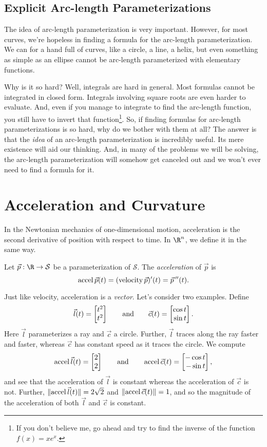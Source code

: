 \subsection{Explicit Arc-length Parameterizations}
The idea of arc-length parameterization is very important.  However, for most curves,
we're hopeless in finding a formula for the arc-length parameterization.  We can for a hand
full of curves, like a circle, a line, a helix, but even something as simple as an ellipse
cannot be arc-length parameterized with elementary functions.

Why is it so hard?  Well, integrals are hard in general.  Most formulas cannot be integrated in closed
form.  Integrals involving square roots are even harder to evaluate.  And, even if you manage
to integrate to find the arc-length function, you still have to invert that function\footnote{ If you don't
believe me, go ahead and 
try to find the inverse of the function $f(x)=xe^x$. }.  So, if finding formulas for arc-length parameterizations
is so hard, why do we bother with them at all?  The answer is that the \emph{idea} of an arc-length parameterization
is incredibly useful. Its mere existence will aid our thinking.  And, in many of the problems we will be solving,
the arc-length parameterization will somehow get canceled out and we won't ever need to find a formula for it.

\begin{exercises}
\end{exercises}

\section{Acceleration and Curvature}
In the Newtonian mechanics of one-dimensional motion, acceleration is the second
derivative of position with respect to time.  In $\R^n$, we define it in the same way.

\begin{definition}[Acceleration]
	Let $\vec p:\R\to\mathcal S$ be a parameterization of $\mathcal S$.  The \emph{acceleration}
	of $\vec p$ is 
	\[
		\operatorname{accel} \vec p(t) = (\operatorname{velocity} \vec p)'(t)=\vec p\,''(t).
	\]
\end{definition}

Just like velocity, acceleration is a \emph{vector}.  Let's consider two examples.  Define
\[
	\vec l(t) = \mat{t^2\\t^2}\qquad\text{and}\qquad\vec c(t) = \mat{\cos t\\\sin t}.
\]
Here $\vec l$ parameterizes a ray and $\vec c$ a circle.  Further, $\vec l$ traces along the ray
faster and faster, whereas $\vec c$ has constant speed as it traces the circle.
We compute 
\[
	\Accel \vec l(t) = \mat{2\\2}\qquad\text{and}\qquad \Accel\vec c(t) = \mat{-\cos t\\ -\sin t},
\]
and see that the acceleration of $\vec l$ is constant whereas the acceleration of $\vec c$ is not.  Further,
$\lVert\operatorname{accel} \vec l(t)\rVert=2\sqrt{2}$ and $\lVert\operatorname{accel} \vec c(t)\rVert=1$, and so the magnitude of the acceleration of
both $\vec l$ and $\vec c$ is constant.

